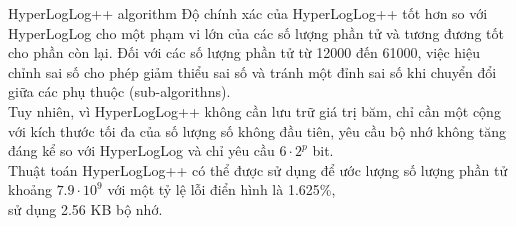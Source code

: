 \documentclass[10pt]{beamer}
\begin{document}
\begin{frame}{HyperLogLog++ algorithm}
  Độ chính xác của HyperLogLog++ tốt hơn so với HyperLogLog cho một phạm vi lớn của các số lượng phần tử và tương đương tốt cho phần còn lại. 
  Đối với các số lượng phần tử từ 12000 đến 61000, việc hiệu chỉnh sai số cho phép giảm thiểu sai số và tránh một đỉnh sai số khi chuyển đổi 
  giữa các phụ thuộc (sub-algorithns).\\
  
  Tuy nhiên, vì HyperLogLog++ không cần lưu trữ giá trị băm, chỉ cần một cộng với kích thước tối đa của số lượng số không đầu tiên, yêu cầu bộ nhớ 
  không tăng đáng kể so với HyperLogLog và chỉ yêu cầu $6 \cdot 2^p$ bit.\\
  
  Thuật toán HyperLogLog++ có thể được sử dụng để ước lượng số lượng phần tử \\
  khoảng $7.9 \cdot 10^9$ với một tỷ lệ lỗi điển hình là 1.625\%, \\
  sử dụng 2.56 KB bộ nhớ.
\end{frame}
\end{document}
